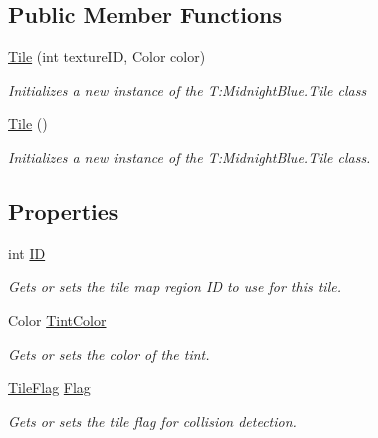 \subsection*{Public Member Functions}
\begin{DoxyCompactItemize}
\item 
\hyperlink{class_midnight_blue_1_1_tile_a4e0e9f97acbb22eb1d54945b44d52e7b}{Tile} (int texture\+ID, Color color)
\begin{DoxyCompactList}\small\item\em Initializes a new instance of the T\+:\+Midnight\+Blue.\+Tile class \end{DoxyCompactList}\item 
\hyperlink{class_midnight_blue_1_1_tile_af89b11fc577df594ffebd0963e9020d4}{Tile} ()
\begin{DoxyCompactList}\small\item\em Initializes a new instance of the T\+:\+Midnight\+Blue.\+Tile class. \end{DoxyCompactList}\end{DoxyCompactItemize}
\subsection*{Properties}
\begin{DoxyCompactItemize}
\item 
int \hyperlink{class_midnight_blue_1_1_tile_a67011be5ab290007a4a45c4b6b0d24f0}{ID}
\begin{DoxyCompactList}\small\item\em Gets or sets the tile map region ID to use for this tile. \end{DoxyCompactList}\item 
Color \hyperlink{class_midnight_blue_1_1_tile_a01da016ec2ef47b50e6bac7e01ae031b}{Tint\+Color}
\begin{DoxyCompactList}\small\item\em Gets or sets the color of the tint. \end{DoxyCompactList}\item 
\hyperlink{namespace_midnight_blue_ad3f455dc6bab1e76768d1a468ae3e33b}{Tile\+Flag} \hyperlink{class_midnight_blue_1_1_tile_a51397c4b6a08c8017a3d5555ed5822c6}{Flag}
\begin{DoxyCompactList}\small\item\em Gets or sets the tile flag for collision detection. \end{DoxyCompactList}\end{DoxyCompactItemize}


